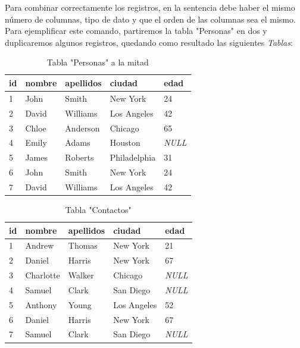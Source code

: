 Para combinar correctamente los registros, en la sentencia debe haber el mismo número de columnas, tipo de dato y que el orden de las columnas sea el mismo. Para ejemplificar este comando, partiremos la tabla "Personas" en dos y duplicaremos algunos registros, quedando como resultado las siguientes \textit{Tablas}:
\begin{table}[H]
    \centering
    \caption{Tabla "Personas" a la mitad}
    \label{tab: 33}
    \begin{tabular}{|l|l|l|l|l|}
        \hline
        \textbf{id} & \textbf{nombre} & \textbf{apellidos} & \textbf{ciudad} & \textbf{edad} \\
        \hline
        1 & John        & Smith     & New York      & 24 \\
        \hline
        2 & David       & Williams  & Los Angeles   & 42 \\
        \hline
        3 & Chloe       & Anderson  & Chicago       & 65 \\
        \hline
        4 & Emily       & Adams     & Houston       & \textit{NULL} \\
        \hline
        5 & James       & Roberts   & Philadelphia  & 31 \\
        \hline
        6 & John        & Smith     & New York      & 24 \\
        \hline
        7 & David       & Williams  & Los Angeles   & 42 \\
        \hline
    \end{tabular}
\end{table}
\begin{table}[H]
    \centering
    \caption{Tabla "Contactos"}
    \label{tab: 34}
    \begin{tabular}{|l|l|l|l|l|}
        \hline
        \textbf{id} & \textbf{nombre} & \textbf{apellidos} & \textbf{ciudad} & \textbf{edad} \\
        \hline
        1 & Andrew      & Thomas    & New York      & 21 \\
        \hline
        2 & Daniel      & Harris    & New York      & 67 \\
        \hline
        3 & Charlotte   & Walker    & Chicago       & \textit{NULL} \\
        \hline
        4 & Samuel      & Clark     & San Diego     & \textit{NULL} \\
        \hline
        5 & Anthony    & Young     & Los Angeles   & 52 \\
        \hline
        6 & Daniel      & Harris    & New York      & 67 \\
        \hline
        7 & Samuel      & Clark     & San Diego     & \textit{NULL} \\
        \hline
    \end{tabular}
\end{table}

